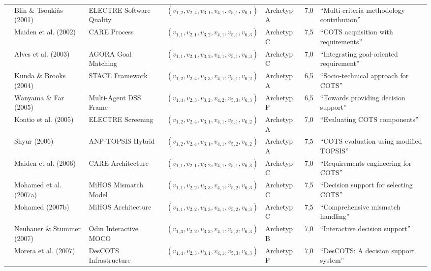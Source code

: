 \begin{longtable}{p{2.0cm} p{2.6cm} p{2.8cm} p{2.7cm} p{2.2cm} p{1.0cm} p{2.5cm}}
\cite{M3B2D3GD} & Blin \& Tsoukiàs (2001) & ELECTRE Software Quality & $(v_{1,2}, v_{2,4}, v_{3,1}, v_{4,1}, v_{5,1}, v_{6,1})$ & Archetyp A & 7,0 & \enquote{Multi-criteria methodology contribution} \\
\cite{TLB687YL} & Maiden et al. (2002) & CARE Process & $(v_{1,1}, v_{2,1}, v_{3,2}, v_{4,1}, v_{5,1}, v_{6,3})$ & Archetyp C & 7,5 & \enquote{COTS acquisition with requirements} \\
\cite{8XNYS4M9} & Alves et al. (2003) & AGORA Goal Matching & $(v_{1,1}, v_{2,1}, v_{3,2}, v_{4,1}, v_{5,1}, v_{6,3})$ & Archetyp C & 7,0 & \enquote{Integrating goal-oriented requirement} \\
\cite{QDUNCXFC} & Kunda \& Brooks (2004) & STACE Framework & $(v_{1,2}, v_{2,4}, v_{3,3}, v_{4,1}, v_{5,1}, v_{6,2})$ & Archetyp A & 6,5 & \enquote{Socio-technical approach for COTS} \\
\cite{CZZ6XQZJ} & Wanyama \& Far (2005) & Multi-Agent DSS Frame & $(v_{1,4}, v_{2,3}, v_{3,2}, v_{4,2}, v_{5,3}, v_{6,3})$ & Archetyp F & 6,5 & \enquote{Towards providing decision support} \\
\cite{LZQJ6M4X} & Kontio et al. (2005) & ELECTRE Screening & $(v_{1,2}, v_{2,4}, v_{3,1}, v_{4,1}, v_{5,1}, v_{6,2})$ & Archetyp A & 7,0 & \enquote{Evaluating COTS components} \\
\cite{U5JPV4SF} & Shyur (2006) & ANP-TOPSIS Hybrid & $(v_{1,2}, v_{2,4}, v_{3,1}, v_{4,1}, v_{5,2}, v_{6,2})$ & Archetyp A & 7,5 & \enquote{COTS evaluation using modified TOPSIS} \\
\cite{6RNULWVY} & Maiden et al. (2006) & CARE Architecture & $(v_{1,1}, v_{2,1}, v_{3,2}, v_{4,1}, v_{5,1}, v_{6,3})$ & Archetyp C & 7,0 & \enquote{Requirements engineering for COTS} \\
\cite{MC9UMXZZ} & Mohamed et al. (2007a) & MiHOS Mismatch Model & $(v_{1,1}, v_{2,2}, v_{3,3}, v_{4,1}, v_{5,2}, v_{6,3})$ & Archetyp C & 7,5 & \enquote{Decision support for selecting COTS} \\
\cite{9F79VAAB} & Mohamed (2007b) & MiHOS Architecture & $(v_{1,1}, v_{2,2}, v_{3,3}, v_{4,1}, v_{5,2}, v_{6,3})$ & Archetyp C & 7,5 & \enquote{Comprehensive mismatch handling} \\
\cite{ZQMG69VT} & Neubauer \& Stummer (2007) & Odin Interactive MOCO & $(v_{1,3}, v_{2,2}, v_{3,3}, v_{4,1}, v_{5,2}, v_{6,3})$ & Archetyp B & 7,0 & \enquote{Interactive decision support} \\
\cite{FCYW9EWJ} & Morera et al. (2007) & DesCOTS Infrastructure & $(v_{1,4}, v_{2,3}, v_{3,1}, v_{4,1}, v_{5,3}, v_{6,3})$ & Archetyp F & 7,0 & \enquote{DesCOTS: A decision support system} \\

\end{longtable}
